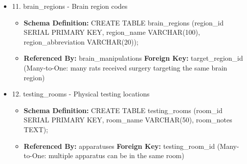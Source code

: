 \documentclass[12pt, titlepage]{article}
\begin{document}
\begin{itemize}
\begin{itemize}
	\item{\textbf{Referenced By: }drug\_rx\_details \textbf{Foreign Key: }drug\_id (Many-to-One: specifies drugs in prescription regimens)}
	\item{\textbf{Referenced By: }session\_drug\_details \textbf{Foreign Key: }drug\_id (Many-to-One: records actual drugs administered)}
\end{itemize}
\item 11. brain\_regions - Brain region codes
\begin{itemize}
	\item{\textbf{Schema Definition: }CREATE TABLE brain\_regions (region\_id SERIAL PRIMARY KEY, region\_name VARCHAR(100), region\_abbreviation VARCHAR(20));}
	\item{\textbf{Referenced By: }brain\_manipulations \textbf{Foreign Key: }target\_region\_id (Many-to-One: many rats received surgery targeting the same brain region)}
\end{itemize}
\item 12. testing\_rooms - Physical testing locations
\begin{itemize}
	\item{\textbf{Schema Definition: }CREATE TABLE testing\_rooms (room\_id SERIAL PRIMARY KEY, room\_name VARCHAR(50), room\_notes
	      TEXT);}
	\item{\textbf{Referenced By: }apparatuses \textbf{Foreign Key: }testing\_room\_id (Many-to-One: multiple apparatus can be in the same room)}
\end{itemize}


\end{itemize}
\end{document}
